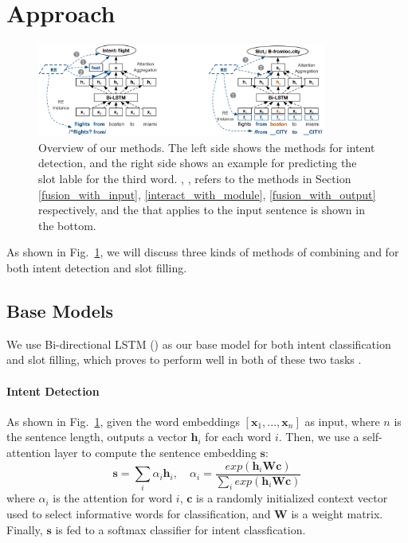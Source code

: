 \section{Approach}

\begin{figure}[t!]
\begin{center}
\includegraphics[width=0.85\textwidth]{figure/re_nn_overview.png}    
\caption{Overview of our methods. The left side shows the methods for intent detection, and the right side shows an example for predicting the slot lable for the third word. , ,  refers to the methods in Section \ref{fusion_with_input}, \ref{interact_with_module}, \ref{fusion_with_output} respectively, and the \RE that applies to the input sentence is shown in the bottom.}
\label{fig_overview}
\end{center}
\vspace{-1em}
\end{figure}

As shown in Fig.~\ref{fig_overview}, we will discuss three kinds of methods of combining \NN and \RE for both intent detection and slot filling.

\subsection{Base Models}
We use Bi-directional LSTM (\BLSTM) as our base \NN model for both intent classification and slot filling, which proves to perform well in both of these two tasks \cite{liu2016attention}. 
\paragraph{Intent Detection}
As shown in Fig.~\ref{fig_overview}, given the word embeddings $[\textbf{x}_1, ..., \textbf{x}_n]$ as input, where $n$ is the sentence length, \BLSTM outputs a vector $\textbf{h}_i$ for each word $i$. 
Then, we use a self-attention layer to compute the sentence embedding $\textbf{s}$:
\begin{equation}
\textbf{s} = \sum_{i}{\alpha_i\textbf{h}_i}, \quad \alpha_i=\frac{exp(\textbf{h}_i\textbf{Wc})}{\sum_{i}{exp(\textbf{h}_i\textbf{Wc})}}
\end{equation}
where  $\alpha_i$ is the attention for word $i$, $\textbf{c}$ is a randomly initialized context vector used to select informative words for classification, and $\textbf{W}$ is a weight matrix. 
Finally, $\textbf{s}$ is fed to a softmax classifier for intent classfication.

